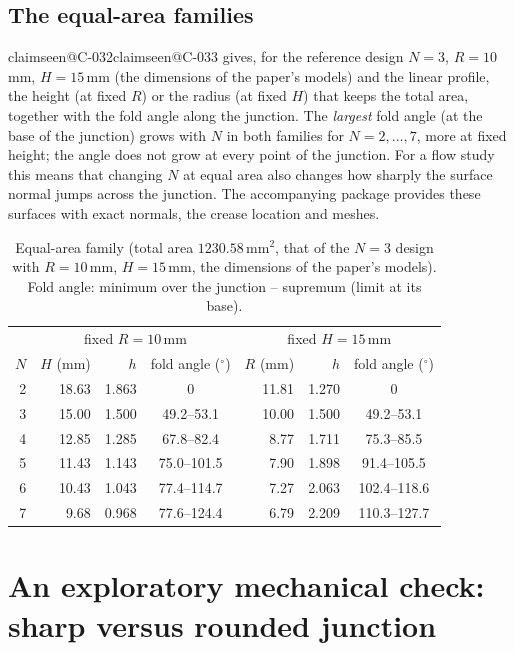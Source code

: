 \documentclass[11pt,a4paper]{article}
\makeatletter
\theoremstyle{plain}
\theoremstyle{remark}
\newcommand{\claim}[1]{\ifcsname claimseen@#1\endcsname\else\expandafter\gdef\csname claimseen@#1\endcsname{}\label{claim:#1}\fi}
\makeatother
\begin{document}
\subsection{The equal-area families}
\claim{C-032}\claim{C-033} gives, for the reference design $N=3$, $R=10$\,mm, $H=15$\,mm (the dimensions of the
paper's models) and the linear profile, the height (at fixed $R$) or the radius (at fixed $H$) that keeps the total area,
together with the fold angle along the junction. The \emph{largest} fold angle (at the base of the junction) grows with $N$
in both families for $N=2,\dots,7$, more at fixed height; the angle does not grow at every point of the junction. For a flow
study this means that changing $N$ at equal area also changes how sharply the surface normal jumps across the junction.
The accompanying package provides these surfaces with exact normals, the crease location and meshes.

\begin{table}[t]\centering\small
\begin{tabular}{r|rrc|rrc}\toprule
 & \multicolumn{3}{c|}{fixed $R=10$\,mm} & \multicolumn{3}{c}{fixed $H=15$\,mm}\\
$N$ & $H$ (mm) & $h$ & fold angle ($^\circ$) & $R$ (mm) & $h$ & fold angle ($^\circ$)\\\midrule
2 & 18.63 & 1.863 & 0 & 11.81 & 1.270 & 0\\
3 & 15.00 & 1.500 & 49.2--53.1 & 10.00 & 1.500 & 49.2--53.1\\
4 & 12.85 & 1.285 & 67.8--82.4 & 8.77 & 1.711 & 75.3--85.5\\
5 & 11.43 & 1.143 & 75.0--101.5 & 7.90 & 1.898 & 91.4--105.5\\
6 & 10.43 & 1.043 & 77.4--114.7 & 7.27 & 2.063 & 102.4--118.6\\
7 & 9.68 & 0.968 & 77.6--124.4 & 6.79 & 2.209 & 110.3--127.7\\
\bottomrule
\end{tabular}
\caption{Equal-area family (total area $1230.58$\,mm$^2$, that of the $N=3$ design with $R=10$\,mm, $H=15$\,mm, the
dimensions of the paper's models). Fold angle: minimum over the junction -- supremum (limit at its base).}
\label{tab:gn}
\end{table}

\section{An exploratory mechanical check: sharp versus rounded junction}\label{sec:fem}
\end{document}
